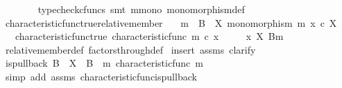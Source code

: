 \begin{isabellebody}
\ \ \ \ \ \ \isamarkupfalse%
\ {\isacharparenleft}{\kern0pt}typecheck{\isacharunderscore}{\kern0pt}cfuncs{\isacharcomma}{\kern0pt}\ smt\ m{\isacharunderscore}{\kern0pt}mono\ monomorphism{\isacharunderscore}{\kern0pt}def{}{\isacharparenright}{\kern0pt}\isanewline
{}\isamarkupfalse%
%
\endisatagproof
{\isafoldproof}%
%
\isadelimproof
\isanewline
%
\endisadelimproof
\isanewline
{}\isamarkupfalse%
\ characteristic{\isacharunderscore}{\kern0pt}func{\isacharunderscore}{\kern0pt}true{\isacharunderscore}{\kern0pt}relative{\isacharunderscore}{\kern0pt}member{\isacharcolon}{\kern0pt}\isanewline
\ \ \ {\isachardoublequoteopen}m\ {\isacharcolon}{\kern0pt}\ B\ {\isasymrightarrow}\ X{\isachardoublequoteclose}\ {\isachardoublequoteopen}monomorphism\ m{\isachardoublequoteclose}\ {\isachardoublequoteopen}x\ {\isasymin}\isactrlsub c\ X{\isachardoublequoteclose}\isanewline
\ \ \ characteristic{\isacharunderscore}{\kern0pt}func{\isacharunderscore}{\kern0pt}true{\isacharcolon}{\kern0pt}\ {\isachardoublequoteopen}characteristic{\isacharunderscore}{\kern0pt}func\ m\ {\isasymcirc}\isactrlsub c\ x\ {\isacharequal}{\kern0pt}\ {\isasymt}{\isachardoublequoteclose}\isanewline
\ \ \ {\isachardoublequoteopen}x\ {\isasymin}\isactrlbsub X\isactrlesub \ {\isacharparenleft}{\kern0pt}B{\isacharcomma}{\kern0pt}m{\isacharparenright}{\kern0pt}{\isachardoublequoteclose}\isanewline
%
\isadelimproof
\ \ %
\endisadelimproof
%
\isatagproof
{}\isamarkupfalse%
\ relative{\isacharunderscore}{\kern0pt}member{\isacharunderscore}{\kern0pt}def{}\ factors{\isacharunderscore}{\kern0pt}through{\isacharunderscore}{\kern0pt}def\isanewline
{}\isamarkupfalse%
\ {\isacharparenleft}{\kern0pt}insert\ assms{\isacharcomma}{\kern0pt}\ clarify{\isacharparenright}{\kern0pt}\isanewline
\ \ \isamarkupfalse%
\ {\isachardoublequoteopen}is{\isacharunderscore}{\kern0pt}pullback\ B\ {\isasymone}\ X\ {\isasymOmega}\ {\isacharparenleft}{\kern0pt}{\isasymbeta}\isactrlbsub B\isactrlesub {\isacharparenright}{\kern0pt}\ {\isasymt}\ m\ {\isacharparenleft}{\kern0pt}characteristic{\isacharunderscore}{\kern0pt}func\ m{\isacharparenright}{\kern0pt}{\isachardoublequoteclose}\isanewline
\ \ \ \ \isamarkupfalse%
\ {\isacharparenleft}{\kern0pt}simp\ add{\isacharcolon}{\kern0pt}\ assms\ characteristic{\isacharunderscore}{\kern0pt}func{\isacharunderscore}{\kern0pt}is{\isacharunderscore}{\kern0pt}pullback{\isacharparenright}{\kern0pt}\isanewline
\ \ \isamarkupfalse%

\end{isabellebody}
